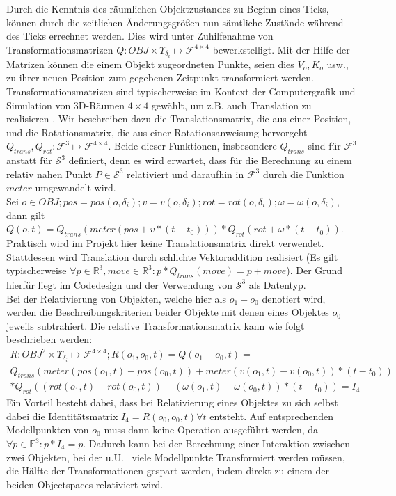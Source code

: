 Durch die Kenntnis des räumlichen Objektzustandes zu Beginn eines Ticks, können durch die zeitlichen Änderungsgrößen nun sämtliche Zustände während des Ticks errechnet werden.
Dies wird unter Zuhilfenahme von Transformationsmatrizen $Q: OBJ \times \Upsilon_{\delta_i} \mapsto \mathcal{F}^{4\times 4}$ bewerkstelligt. Mit der Hilfe der Matrizen können die einem Objekt zugeordneten Punkte, seien dies $V_o, K_o$ usw., zu ihrer neuen Position zum gegebenen Zeitpunkt transformiert werden. Transformationsmatrizen sind typischerweise im Kontext der Computergrafik und Simulation von 3D-Räumen $4\times 4$ gewählt, um z.B. auch Translation zu realisieren \cite[ch. 4.4.1, p.76]{fourcrossfour}. Wir beschreiben dazu die 
Translationsmatrix, die aus einer Position, und die Rotationsmatrix, die aus einer Rotationsanweisung hervorgeht $Q_{trans}, Q_{rot}:\mathcal{F}^3 \mapsto \mathcal{F}^{4\times 4}$. Beide dieser Funktionen, insbesondere $Q_{trans}$ sind für $\mathcal{F}^3$ anstatt für $\mathcal{S}^3$ definiert, denn es wird erwartet, dass für die Berechnung zu einem relativ nahen Punkt $P \in\mathcal{S}^3$ relativiert und daraufhin in $\mathcal{F}^3$ durch die Funktion $meter$ umgewandelt wird.\\
Sei $o \in OBJ; pos = pos(o, \delta_i); v = v(o, \delta_i); rot = rot(o, \delta_i); \omega = \omega(o, \delta_i)$, dann gilt
$Q(o, t) = Q_{trans}(meter(pos + v * (t-t_0))) * Q_{rot}(rot + \omega * (t - t_0))$.\\
Praktisch wird im Projekt hier keine Translationsmatrix direkt verwendet. Stattdessen wird Translation durch schlichte Vektoraddition realisiert (Es gilt typischerweise $\forall p \in\mathbb{R}^3, move \in \mathbb{R}^3 : p * Q_{trans}(move) = p + move$). Der Grund hierfür liegt im Codedesign und der Verwendung von $\mathcal{S}^3$ als Datentyp.\\
Bei der Relativierung von Objekten, welche hier als $o_1 - o_0$ denotiert wird, werden die Beschreibungskriterien beider Objekte mit denen eines Objektes $o_0$ jeweils subtrahiert. Die relative Transformationsmatrix kann wie folgt beschrieben werden:
\begin{align}
R: OBJ^2 \times \Upsilon_{\delta_i} \mapsto \mathcal{F}^{4\times 4}; R(o_1, o_0, t) = Q(o_1 - o_0, t) = \\
Q_{trans}( meter(  pos(o_1, t)-pos(o_0, t) ) + meter(v(o_1, t)-v(o_0, t)) * (t-t_0) ) \\
* Q_{rot}((rot(o_1, t)-rot(o_0, t)) + (\omega(o_1, t)-\omega(o_0, t)) * (t-t_0))= I_4
\end{align}
Ein Vorteil besteht dabei, dass bei Relativierung eines Objektes zu sich selbst dabei die Identitätsmatrix $I_4 = R(o_0, o_0, t) \forall t$ entsteht. Auf entsprechenden Modellpunkten von $o_0$ muss dann keine Operation ausgeführt werden, da $\forall p\in \mathbb{F}^3: p*I_4=p$. Dadurch kann bei der Berechnung einer Interaktion zwischen zwei Objekten, bei der u.U.~ viele Modellpunkte Transformiert werden müssen, die Hälfte der Transformationen gespart werden, indem direkt zu einem der beiden Objectspaces relativiert wird.\\
